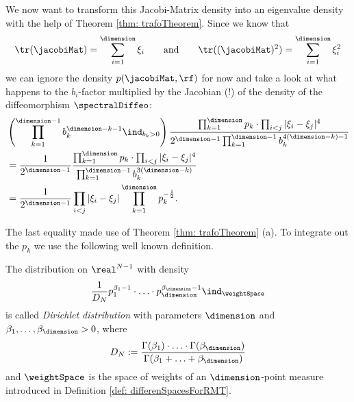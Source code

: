 We now want to transform this Jacobi-Matrix density into an eigenvalue density with the help of Theorem \ref{thm: trafoTheorem}. Since we know that
$$ \tr(\jacobiMat) = \sum_{i=1}^\dimension \xi_i \qquad \text{and} \qquad \tr((\jacobiMat)^2) = \sum_{i=1}^\dimension \xi_i^2 $$
we can ignore the density $p(\jacobiMat,\rf)$ for now and take a look at what happens to the $b_i$-factor multiplied by the Jacobian (!) of the density of the diffeomorphism $\spectralDiffeo$:
\begin{align*}
    & \left(\prod_{k=1}^{\dimension-1} b_k^{\dimension-k-1} \ind_{b_k>0} \right)
    \frac{\prod_{k=1}^\dimension p_k \cdot \prod_{i<j} |\xi_i - \xi_j|^4}{2^{\dimension-1} \prod_{k=1}^{\dimension-1} b_k^{4(\dimension - k)-1}} \\
    & = \frac{1}{2^{\dimension-1}}  \frac{\prod_{k=1}^\dimension p_k \cdot \prod_{i<j} |\xi_i - \xi_j|^4}{\prod_{k=1}^{\dimension-1} b_k^{3(\dimension - k)}} \\
    & = \frac{1}{2^{\dimension-1}} \prod_{i<j} |\xi_i - \xi_j| \prod_{k=1}^\dimension p_k^{-\frac{1}{2}}.
\end{align*}

The last equality made use of Theorem \ref{thm: trafoTheorem} (a). To integrate out the $p_k$ we use the following well known definition.

\begin{definition}
    The distribution on $\real^{N-1}$ with density
    \begin{align*}
        \frac{1}{D_N} p_1^{\beta_1 - 1} \cdot \ldots \cdot p_\dimension^{\beta_\dimension-1} \ind_{\weightSpace}
    \end{align*}
    is called \textit{Dirichlet distribution} with parameters $\dimension$ and $\beta_1,\ldots,\beta_\dimension > 0$, where
    \begin{align*}
        D_N := \frac{\Gamma(\beta_1)\cdot \ldots \cdot \Gamma(\beta_{\dimension})}{\Gamma(\beta_1+\ldots+\beta_\dimension)}
    \end{align*}
    and $\weightSpace$ is the space of weights of an $\dimension$-point measure introduced in Definition \ref{def: differenSpacesForRMT}.
\end{definition}

